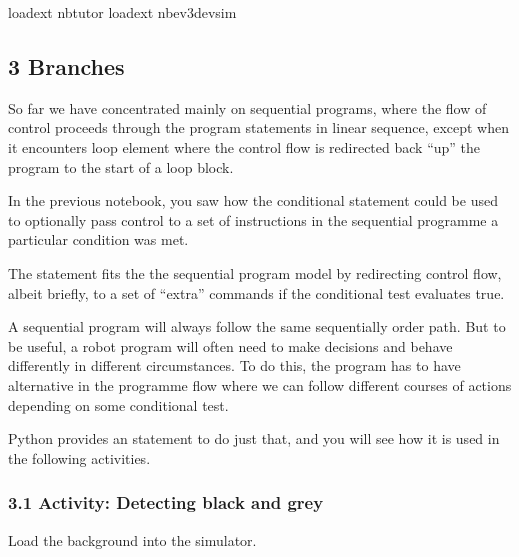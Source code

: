 \documentclass[letterpaper,10pt,english]{sphinxmanual}
\begin{document}
{{
\begin{sphinxVerbatim}[commandchars=\\\{\}]
\llap{\color{nbsphinxin}[ ]:\,\hspace{\fboxrule}\hspace{\fboxsep}}\PYGZpc{}load\PYGZus{}ext nbtutor
\PYGZpc{}load\PYGZus{}ext nbev3devsim
\end{sphinxVerbatim}
}


\subsection{3 Branches}
\label{\detokenize{content/02_Robot_Lab/Section_00_02:3-Branches}}\label{\detokenize{content/02_Robot_Lab/Section_00_02::doc}}
So far we have concentrated mainly on sequential programs, where the flow of control proceeds through the program statements in linear sequence, except when it encounters loop element where the control flow is redirected back “up” the program to the start of a loop block.

In the previous notebook, you saw how the conditional  statement could be used to optionally pass control to a set of instructions in the sequential programme  a particular condition was met.

The  statement fits the the sequential program model by redirecting control flow, albeit briefly, to a set of “extra” commands if the conditional test evaluates true.

A sequential program will always follow the same sequentially order path. But to be useful, a robot program will often need to make decisions and behave differently in different circumstances. To do this, the program has to have alternative  in the programme flow where we can follow different courses of actions depending on some conditional test.

Python provides an  statement to do just that, and you will see how it is used in the following activities.



\subsubsection{3.1 Activity: Detecting black and grey}
\label{\detokenize{content/02_Robot_Lab/Section_00_02:3.1-Activity:-Detecting-black-and-grey}}
Load the  background into the simulator.

}
\end{document}
